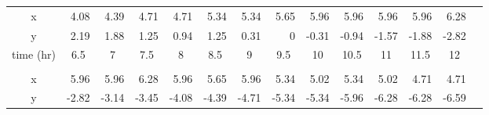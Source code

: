 \documentclass{article}
\begin{document}
\begin{table}[!b]
\begin{tabular}{crrrrrrrrrrrrl}
		\multicolumn{1}{|c|}{x}         & \multicolumn{1}{r|}{4.08}  & \multicolumn{1}{r|}{4.39}  & \multicolumn{1}{r|}{4.71}  & \multicolumn{1}{r|}{4.71}  & \multicolumn{1}{r|}{5.34}  & \multicolumn{1}{r|}{5.34}  & \multicolumn{1}{r|}{5.65}  & \multicolumn{1}{r|}{5.96}  & \multicolumn{1}{r|}{5.96}  & \multicolumn{1}{r|}{5.96}  & \multicolumn{1}{r|}{5.96}  & \multicolumn{1}{r|}{6.28}  & \multicolumn{1}{r}{}      \\ \cline{1-13}
		\multicolumn{1}{|c|}{y}         & \multicolumn{1}{r|}{2.19}  & \multicolumn{1}{r|}{1.88}  & \multicolumn{1}{r|}{1.25}  & \multicolumn{1}{r|}{0.94}  & \multicolumn{1}{r|}{1.25}  & \multicolumn{1}{r|}{0.31}  & \multicolumn{1}{r|}{0}     & \multicolumn{1}{r|}{-0.31} & \multicolumn{1}{r|}{-0.94} & \multicolumn{1}{r|}{-1.57} & \multicolumn{1}{r|}{-1.88} & \multicolumn{1}{r|}{-2.82} & \multicolumn{1}{r}{}      \\ \cline{1-13}
		\multicolumn{1}{|c|}{time (hr)} & \multicolumn{1}{c|}{6.5}   & \multicolumn{1}{c|}{7}     & \multicolumn{1}{c|}{7.5}   & \multicolumn{1}{c|}{8}     & \multicolumn{1}{c|}{8.5}   & \multicolumn{1}{c|}{9}     & \multicolumn{1}{c|}{9.5}   & \multicolumn{1}{c|}{10}    & \multicolumn{1}{c|}{10.5}  & \multicolumn{1}{c|}{11}    & \multicolumn{1}{c|}{11.5}  & \multicolumn{1}{c|}{12}    & \multicolumn{1}{c}{}      \\ \cline{1-13}
		\multicolumn{1}{l}{}            & \multicolumn{1}{l}{}       & \multicolumn{1}{l}{}       & \multicolumn{1}{l}{}       & \multicolumn{1}{l}{}       & \multicolumn{1}{l}{}       & \multicolumn{1}{l}{}       & \multicolumn{1}{l}{}       & \multicolumn{1}{l}{}       & \multicolumn{1}{l}{}       & \multicolumn{1}{l}{}       & \multicolumn{1}{l}{}       & \multicolumn{1}{l}{}       &                           \\ \cline{1-13}
		\multicolumn{1}{|c|}{x}         & \multicolumn{1}{r|}{5.96}  & \multicolumn{1}{r|}{5.96}  & \multicolumn{1}{r|}{6.28}  & \multicolumn{1}{r|}{5.96}  & \multicolumn{1}{r|}{5.65}  & \multicolumn{1}{r|}{5.96}  & \multicolumn{1}{r|}{5.34}  & \multicolumn{1}{r|}{5.02}  & \multicolumn{1}{r|}{5.34}  & \multicolumn{1}{r|}{5.02}  & \multicolumn{1}{r|}{4.71}  & \multicolumn{1}{r|}{4.71}  & \multicolumn{1}{r}{}      \\ \cline{1-13}
		\multicolumn{1}{|c|}{y}         & \multicolumn{1}{r|}{-2.82} & \multicolumn{1}{r|}{-3.14} & \multicolumn{1}{r|}{-3.45} & \multicolumn{1}{r|}{-4.08} & \multicolumn{1}{r|}{-4.39} & \multicolumn{1}{r|}{-4.71} & \multicolumn{1}{r|}{-5.34} & \multicolumn{1}{r|}{-5.34} & \multicolumn{1}{r|}{-5.96} & \multicolumn{1}{r|}{-6.28} & \multicolumn{1}{r|}{-6.28} & \multicolumn{1}{r|}{-6.59} & \multicolumn{1}{r}{}      \\ \cline{1-13}

\end{tabular}
\end{table}
\end{document}
